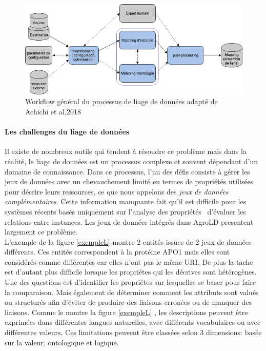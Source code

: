 \begin{figure}[!ht]
\begin{center}
	\includegraphics[width=1\textwidth]{Figures/liage.png}
\end{center}
\caption{\label{liage1} Workflow général du processus de liage de données adapté de Achichi et al,2018~\cite{erv271} }
\end{figure}

\paragraph{Les challenges du liage de données}
Il existe de nombreux outils qui tendent à résoudre ce problème mais dans la réalité, le liage de données est un processus complexe et souvent dépendant d'un domaine de connaissance. Dans ce processus, l'un des défis consiste à gérer les jeux de données avec un chevauchement limité en termes de propriétés utilisées pour décrire leurs ressources, ce que nous appelons des \textit{jeux de données complémentaires}. Cette information manquante fait qu'il est difficile pour les systèmes récents basés uniquement sur l'analyse des propriétés~\cite{Jentzsch,Ngomo2011} d'évaluer les relations entre instances. Les jeux de données intégrés dans AgroLD presentent largement ce problème. \\

L’exemple de la figure \ref{exempleL} montre 2 entités issues de 2 jeux de données différents. Ces entités correspondent à la protéine APO1 mais elles sont considérés comme différentes car elles n’ont pas le même URI. De plus la tache est d'autant plus difficile lorsque les propriétes qui les décrives sont hétérogènes. Une des questions est d'identifier les propriétes sur lesquelles se baser pour faire la comparaison. Mais également de déterminer comment les attributs sont valués ou structurés afin d'éviter de produire des liaisons erronées ou de manquer des liaisons. Comme le montre la figure  \ref{exempleL} , les descriptions peuvent être exprimées dans différentes langues naturelles, avec différents vocabulaires ou avec différentes valeurs. Ces limitations peuvent être classées selon 3 dimensions: basée sur la valeur, ontologique et logique. \\



